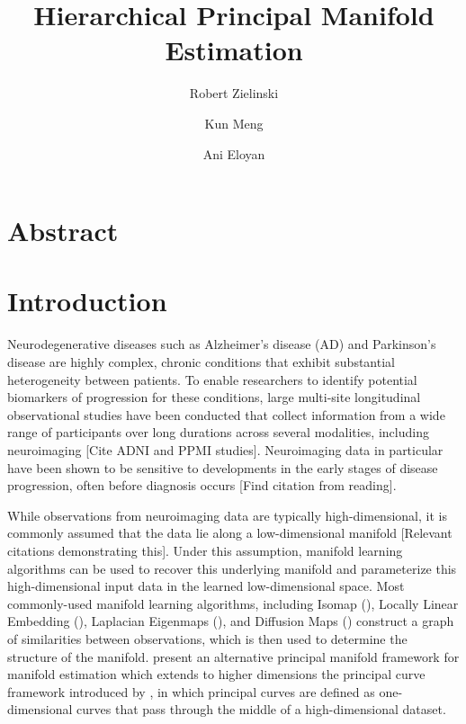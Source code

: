 \documentclass[11pt,reqno]{article}
\theoremstyle{definition}
\begin{document}
\title{Hierarchical Principal Manifold Estimation}
\author[1]{Robert Zielinski}
\author[2]{Kun Meng}
\author[1]{Ani Eloyan}



\maketitle

\doublespacing

\section*{Abstract}

\section{Introduction}

Neurodegenerative diseases such as Alzheimer's disease (AD) and Parkinson's disease are highly complex, chronic conditions that exhibit substantial heterogeneity between patients. To enable researchers to identify potential biomarkers of progression for these conditions, large multi-site longitudinal observational studies have been conducted that collect information from a wide range of participants over long durations across several modalities, including neuroimaging [Cite ADNI and PPMI studies]. Neuroimaging data in particular have been shown to be sensitive to developments in the early stages of disease progression, often before diagnosis occurs [Find citation from reading].

While observations from neuroimaging data are typically high-dimensional, it is commonly assumed that the data lie along a low-dimensional manifold [Relevant citations demonstrating this]. Under this assumption, manifold learning algorithms can be used to recover this underlying manifold and parameterize this high-dimensional input data in the learned low-dimensional space. Most commonly-used manifold learning algorithms, including Isomap (\cite{tenenbaumGlobalGeometricFramework2000}), Locally Linear Embedding (\cite{roweisNonlinearDimensionalityReduction2000}), Laplacian Eigenmaps (\cite{belkinLaplacianEigenmapsDimensionality2003}), and Diffusion Maps (\cite{coifmanDiffusionMaps2006}) construct a graph of similarities between observations, which is then used to determine the structure of the manifold. \cite{mengPrincipalManifoldEstimation2021} present an alternative principal manifold framework for manifold estimation which extends to higher dimensions the principal curve framework introduced by \cite{hastiePrincipalCurves1989}, in which principal curves are defined as one-dimensional curves that pass through the middle of a high-dimensional dataset. 
\end{document}
